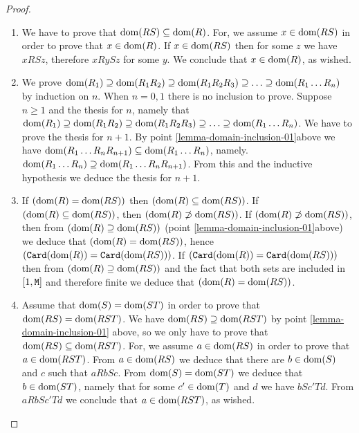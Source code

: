 \documentclass{lmcs}
\begin{document}
\begin{proof}
\begin{enumerate}

\item
We have to prove that ${\rm dom}(RS) \subseteq {\rm dom}(R)$. For, we assume $x \in {\rm dom}(RS)$ in 
order to prove that $x \in {\rm dom}(R)$. If $x \in {\rm dom}(RS)$ then for some $z$ we have $x RS z$, 
therefore $x R y S z$ for some $y$. We conclude that $x \in {\rm dom}(R)$, as wished.

\item
We prove 
$
{\rm dom}(R_1) \supseteq 
{\rm dom}(R_1 R_2) \supseteq 
{\rm dom}(R_1 R_2 R_3) \supseteq 
\ldots \supseteq 
{\rm dom}(R_1 \ldots R_n)
$ 
by induction on $n$. 
When $n=0,1$ there is no inclusion to prove. Suppose $n \ge 1$ and the thesis 
for $n$, namely that ${\rm dom}(R_1) \supseteq {\rm dom}(R_1 R_2) \supseteq {\rm dom}(R_1 R_2 R_3) 
\supseteq \ldots \supseteq {\rm dom}(R_1 \ldots R_n)$. We have to prove the thesis for $n+1$. 
By point \ref{lemma-domain-inclusion-01}above 
we have ${\rm dom}(R_1 \ldots R_{n} R_{n+1}) \subseteq {\rm dom}(R_1 \ldots R_{n})$, namely. 
${\rm dom}(R_1 \ldots R_{n}) \supseteq {\rm dom}(R_1 \ldots R_{n} R_{n+1})$. 
From this and the inductive hypothesis we deduce the thesis for $n+1$.

\item
If $({\rm dom}(R) = {\rm dom}(RS))$ then $({\rm dom}(R) \subseteq {\rm dom}(RS))$. If
$({\rm dom}(R) \subseteq {\rm dom}(RS))$, then $({\rm dom}(R) \not \supset {\rm dom}(RS))$.
If $({\rm dom}(R) \not \supset {\rm dom}(RS))$, then from $({\rm dom}(R) \supseteq {\rm dom}(RS))$
(point \ref{lemma-domain-inclusion-01}above) we deduce that $({\rm dom}(R) = {\rm dom}(RS))$,
hence $({\tt Card}({\rm dom}(R)) = {\tt Card}({\rm dom}(RS)))$. If $({\tt Card}({\rm dom}(R)) = {\tt Card}({\rm dom}(RS)))$
then from $({\rm dom}(R) \supseteq {\rm dom}(RS))$ and the fact that both sets are included in
$[1,{\tt M}]$ and therefore finite we deduce that $({\rm dom}(R) = {\rm dom}(RS))$.

\item
Assume that ${\rm dom}(S) = {\rm dom}(ST)$ in order to prove that 
${\rm dom}(RS) = {\rm dom}(RST)$. 
We have ${\rm dom}(RS) \supseteq {\rm dom}(RST)$ by point \ref{lemma-domain-inclusion-01} above,
so we only have to prove that ${\rm dom}(RS) \subseteq {\rm dom}(RST)$.
For, we assume $a \in {\rm dom}(RS)$ in order to prove that $a \in {\rm dom}(RST)$. 
From $a \in {\rm dom}(RS)$ we deduce that there are $b \in {\rm dom}(S)$ and $c$ such that $a R b S c$. 
From  ${\rm dom}(S) = {\rm dom}(ST)$ we deduce that $b \in {\rm dom}(ST)$, namely that
for some $c' \in {\rm dom}(T)$ and $d$ we have $b S c' T d$. From $a R b S c' T d$ we conclude
that $a \in {\rm dom}(RST)$, as wished.

\end{enumerate}
\end{proof}
\end{document}
